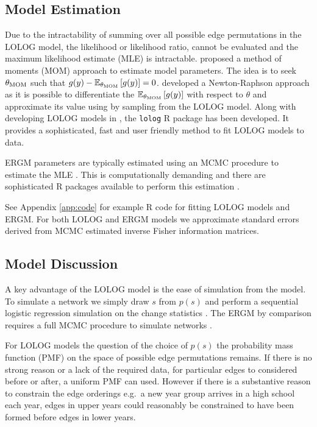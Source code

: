 \documentclass[
]{statsoc}
\begin{document}
\subsection{Model Estimation}

Due to the intractability of summing over all possible edge permutations
in the LOLOG model, the likelihood or likelihood ratio, cannot be
evaluated and the maximum likelihood estimate (MLE) is intractable.
\cite{Fellows2018} proposed a method of moments (MOM) approach to
estimate model parameters. The idea is to seek \(\theta_{{\rm MOM}}\)
such that
\(g(y) - \mathbb{E}_{\theta_{{\rm MOM}}}\left[ g(y) \right] = 0\).
\cite{Fellows2018} developed a Newton-Raphson approach as it is possible
to differentiate the
\(\mathbb{E}_{\theta_{{\rm MOM}}}\left[ g(y) \right]\) with respect to
\(\theta\) and approximate its value using by sampling from the LOLOG
model. Along with developing LOLOG models in \cite{Fellows2018}, the
\texttt{lolog} R package \citep{LOLOG_github} has been developed. It
provides a sophisticated, fast and user friendly method to fit LOLOG
models to data.

ERGM parameters are typically estimated using an MCMC procedure to
estimate the MLE \citep{Snijders2002,Hunter2006}. This is
computationally demanding and there are sophisticated R packages
available to perform this estimation \citep{ergm_3_9_4}.

See Appendix \ref{app:code} for example R code for fitting LOLOG models
and ERGM. For both LOLOG and ERGM models we approximate standard errors
derived from MCMC estimated inverse Fisher information matrices.

\subsection{Model Discussion}\label{sec:comparison}

A key advantage of the LOLOG model is the ease of simulation from the
model. To simulate a network we simply draw \(s\) from \(p(s)\) and
perform a sequential logistic regression simulation on the change
statistics \citep{LOLOG_github}. The ERGM by comparison requires a full
MCMC procedure to simulate networks \citep{ergm_3_9_4}.

For LOLOG models the question of the choice of \(p(s)\) the probability
mass function (PMF) on the space of possible edge permutations remains.
If there is no strong reason or a lack of the required data, for
particular edges to considered before or after, a uniform PMF can used.
However if there is a substantive reason to constrain the edge orderings
e.g.~a new year group arrives in a high school each year, edges in upper
years could reasonably be constrained to have been formed before edges
in lower years.
\end{document}
